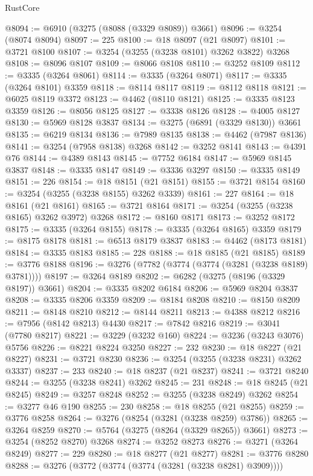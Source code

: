 \begin{lexlean}{RustCore}
\begin{coremodule}
@8094 := @6910 (@3275 (@8088 (@3329 @8089)) @3661)
@8096 := @3254 (@8074 @8094)
@8097 := 225
@8100 := @18 @8097 (@21 @8097)
@8101 := @3721 @8100
@8107 := @3254 (@3255 (@3238 @8101) @3262 @3822) @3268
@8108 := @8096 @8107
@8109 := @8066 @8108
@8110 := @3252 @8109
@8112 := @3335 (@3264 @8061)
@8114 := @3335 (@3264 @8071)
@8117 := @3335 (@3264 @8101) @3359
@8118 := @8114 @8117
@8119 := @8112 @8118
@8121 := @6025 @8119 @3372
@8123 := @4462 (@8110 @8121)
@8125 := @3335 @8123 @3359
@8126 := @8056 @8125
@8127 := @3338 @8126
@8128 := @4005 @8127
@8130 := @5969 @8128 @3837
@8134 := @3275 (@6891 (@3329 @8130)) @3661
@8135 := @6219 @8134
@8136 := @7989 @8135
@8138 := @4462 (@7987 @8136)
@8141 := @3254 (@7958 @8138) @3268
@8142 := @3252 @8141
@8143 := @4391 @76
@8144 := @4389 @8143
@8145 := @7752 @6184
@8147 := @5969 @8145 @3837
@8148 := @3335 @8147
@8149 := @3336 @3297
@8150 := @3335 @8149
@8151 := 226
@8154 := @18 @8151 (@21 @8151)
@8155 := @3721 @8154
@8160 := @3254 (@3255 (@3238 @8155) @3262 @3339)
@8161 := 227
@8164 := @18 @8161 (@21 @8161)
@8165 := @3721 @8164
@8171 := @3254 (@3255 (@3238 @8165) @3262 @3972) @3268
@8172 := @8160 @8171
@8173 := @3252 @8172
@8175 := @3335 (@3264 @8155)
@8178 := @3335 (@3264 @8165) @3359
@8179 := @8175 @8178
@8181 := @6513 @8179 @3837
@8183 := @4462 (@8173 @8181)
@8184 := @3335 @8183
@8185 := 228
@8188 := @18 @8185 (@21 @8185)
@8189 := @3776 @8188
@8196 := @3276 (@7782 (@3774 (@3774 (@3281 (@3238 @8189) @3781))))
@8197 := @3264 @8189
@8202 := @6282 (@3275 (@8196 (@3329 @8197)) @3661)
@8204 := @3335 @8202 @6184
@8206 := @5969 @8204 @3837
@8208 := @3335 @8206 @3359
@8209 := @8184 @8208
@8210 := @8150 @8209
@8211 := @8148 @8210
@8212 := @8144 @8211
@8213 := @4388 @8212
@8216 := @7956 (@8142 @8213) @4430
@8217 := @7842 @8216
@8219 := @3041 (@7780 @8217)
@8221 := @3229 (@3232 @160)
@8224 := @3236 (@3243 @3076) @5756
@8226 := @8221 @8224 @3250
@8227 := 232
@8230 := @18 @8227 (@21 @8227)
@8231 := @3721 @8230
@8236 := @3254 (@3255 (@3238 @8231) @3262 @3337)
@8237 := 233
@8240 := @18 @8237 (@21 @8237)
@8241 := @3721 @8240
@8244 := @3255 (@3238 @8241) @3262
@8245 := 231
@8248 := @18 @8245 (@21 @8245)
@8249 := @3257 @8248
@8252 := @3255 (@3238 @8249) @3262
@8254 := @3277 @46 @190
@8255 := 230
@8258 := @18 @8255 (@21 @8255)
@8259 := @3776 @8258
@8264 := @3276 (@8254 (@3281 (@3238 @8259) @3786))
@8265 := @3264 @8259
@8270 := @5764 (@3275 (@8264 (@3329 @8265)) @3661)
@8273 := @3254 (@8252 @8270) @3268
@8274 := @3252 @8273
@8276 := @3271 (@3264 @8249)
@8277 := 229
@8280 := @18 @8277 (@21 @8277)
@8281 := @3776 @8280
@8288 := @3276 (@3772 (@3774 (@3774 (@3281 (@3238 @8281) @3909))))

\end{coremodule}
\end{lexlean}
